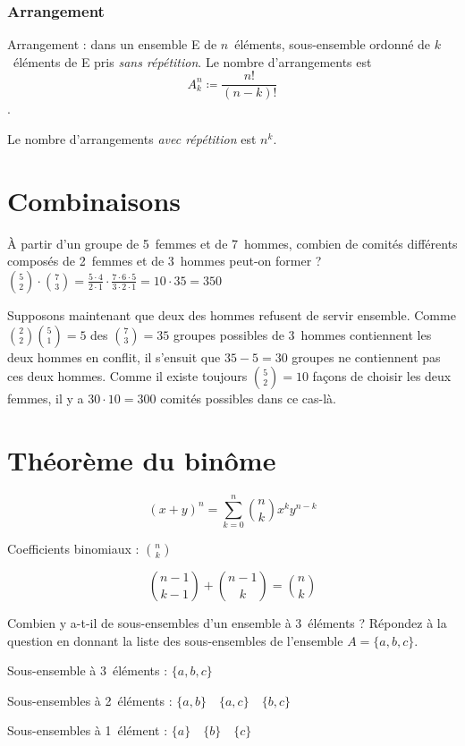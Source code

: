 \subsubsection{Arrangement}
Arrangement : dans un ensemble E de $n$~éléments, sous-ensemble ordonné de $k$~éléments de E pris \emph{sans répétition}. Le nombre d’arrangements est \[A_k^n \coloneqq \frac{n!}{(n-k)!}\].

Le nombre d’arrangements \emph{avec répétition} est $n^k$.



\section{Combinaisons}
\noindent À partir d’un groupe de 5~femmes et de 7~hommes, combien de comités différents composés
de 2~femmes et de 3~hommes peut-on former ?
 $\binom{5}{2} \cdot \binom{7}{3} = \frac{5 \cdot 4}{2 \cdot 1} \cdot \frac{7 \cdot 6 \cdot 5}{3 \cdot 2 \cdot 1} = 10 \cdot 35 = 350$

Supposons maintenant que deux des hommes refusent de servir ensemble. Comme $\binom{2}{2}\binom{5}{1}=5$ des $\binom{7}{3}=35$ groupes possibles de 3~hommes contiennent les deux hommes en conflit, il s’ensuit que $35-5=30$ groupes ne contiennent pas ces deux hommes. Comme il existe toujours $\binom{5}{2}=10$ façons de choisir les deux femmes, il y a $30 \cdot 10 = 300$ comités possibles dans ce cas-là.


\section{Théorème du binôme}
\[(x+y)^n = \sum_{k=0}^{n}\binom{n}{k}x^ky^{n-k}\]

Coefficients binomiaux : $\binom{n}{k}$

\[\binom{n-1}{k-1} + \binom{n-1}{k} = \binom{n}{k}\]

 Combien y a-t-il de sous-ensembles d’un ensemble à 3~éléments ? Répondez à la question en donnant la liste des sous-ensembles de l’ensemble $A = \{a,b,c\}$.
\sol

Sous-ensemble à 3~éléments : $\{a,b,c\}$

Sous-ensembles à 2~éléments : $\{a,b\} \quad \{a,c\} \quad \{b,c\}$

Sous-ensembles à 1~élément : $\{a\} \quad \{b\} \quad \{c\}$

